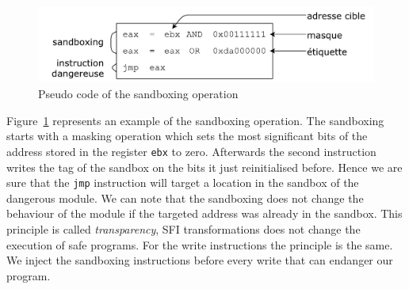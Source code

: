 \documentclass[11pt]{sdm}
\begin{document}
\begin{figure}[!ht]
\centering
\includegraphics[scale=0.5]{images/algo_sandboxing.pdf}
\caption{Pseudo code of the sandboxing operation}
\label{algo_sandbox}
\end{figure}


Figure~\ref{algo_sandbox} represents an example of the sandboxing operation. The sandboxing starts with a masking operation which sets the most significant bits of the address stored in the register \texttt{ebx} to zero. Afterwards the second instruction writes the tag of the sandbox on the bits it just reinitialised before. Hence we are sure that the \texttt{jmp} instruction will target a location in the sandbox of the dangerous module. We can note that the sandboxing does not change the behaviour of the module if the targeted address was already in the sandbox. This principle is called \textit{transparency}, SFI transformations does not change the execution of safe programs. For the write instructions the principle is the same. We inject the sandboxing instructions before every write that can endanger our program.
\end{document}
